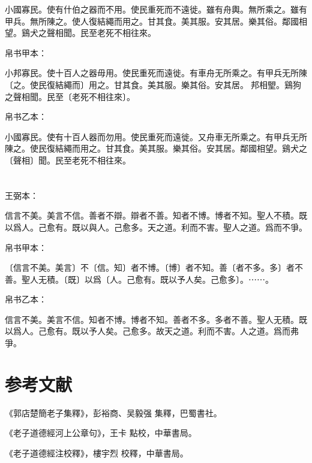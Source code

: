 \documentclass[a5paper]{ctexbook}
\begin{document}
    小國寡民。使有什伯之器而不用。使民重死而不遠徙。雖有舟輿。無所乘之。雖有甲兵。無所陳之。使人復結繩而用之。甘其食。美其服。安其居。樂其俗。鄰國相望。鷄犬之聲相聞。民至老死不相往來。

    
    帛书甲本：

    小邦寡民。使十百人之器毋用。使民重死而遠徙。有車舟无所乘之。有甲兵无所陳〔之。使民復結繩而〕用之。甘其食。美其服。樂其俗。安其居。󱁉邦相朢。鷄狗之聲相聞。民至〔老死不相往來〕。

    帛书乙本：

    小國寡民。使有十百人器而勿用。使民重死而遠徙。又舟車无所乘之。有甲兵无所陳之。使民復結繩而用之。甘其食。美其服。樂其俗。安其居。鄰國相望。鷄犬之〔聲相〕聞。民至老死不相往來。

    \chapter{}
    王弼本：

    信言不美。美言不信。善者不辯。辯者不善。知者不博。博者不知。聖人不積。既以爲人。己愈有。既以與人。己愈多。天之道。利而不害。聖人之道。爲而不爭。

    
    帛书甲本：

    〔信言不美。美言〕不〔信。知〕者不博。〔博〕者不知。善〔者不多。多〕者不善。聖人无積。〔既〕以爲〔人。己愈有。既以予人矣。己愈多〕。⋯⋯。

    帛书乙本：

    信言不美。美言不信。知者不博。博者不知。善者不多。多者不善。聖人无積。既以爲人。己愈有。既以予人矣。己愈多。故天之道。利而不害。人之道。爲而弗爭。

    \chapter*{参考文献}
    《郭店楚簡老子集釋》，彭裕商、吴毅强 集釋，巴蜀書社。

    《老子道德經河上公章句》，王卡 點校，中華書局。

    《老子道德經注校釋》，樓宇烈 校釋，中華書局。
\end{document}
